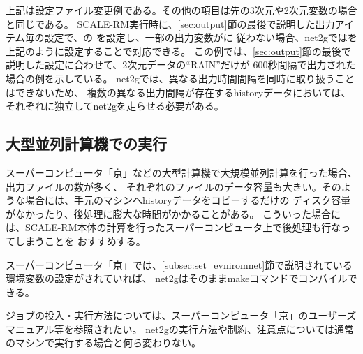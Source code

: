 \noindent 上記は設定ファイル変更例である。その他の項目は先の3次元や2次元変数の場合と同じである。
SCALE-RM実行時に、\ref{sec:output}節の最後で説明した出力アイテム毎の設定で、の
を設定し、一部の出力変数がに
従わない場合、net2gではを上記のように設定することで対応できる。
この例では、\ref{sec:output}節の最後で説明した設定に合わせて、2次元データの``RAIN''だけが
600秒間隔で出力された場合の例を示している。
net2gでは、異なる出力時間間隔を同時に取り扱うことはできないため、
複数の異なる出力間隔が存在するhistoryデータにおいては、それぞれに独立してnet2gを走らせる必要がある。


\subsection{大型並列計算機での実行} \label{subsec:on_supercom}

スーパーコンピュータ「京」などの大型計算機で大規模並列計算を行った場合、出力ファイルの数が多く、
それぞれのファイルのデータ容量も大きい。そのような場合には、手元のマシンへhistoryデータをコピーするだけの
ディスク容量がなかったり、後処理に膨大な時間がかかることがある。
こういった場合には、SCALE-RM本体の計算を行ったスーパーコンピュータ上で後処理も行なってしまうことを
おすすめする。

スーパーコンピュータ「京」では、\ref{subsec:set_evniromnet}節で説明されている環境変数の設定がされていれば、
net2gはそのままmakeコマンドでコンパイルできる。

ジョブの投入・実行方法については、スーパーコンピュータ「京」のユーザーズマニュアル等を参照されたい。
net2gの実行方法や制約、注意点については通常のマシンで実行する場合と何ら変わりない。



